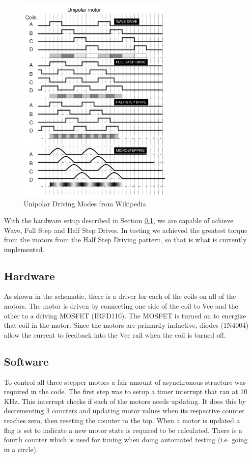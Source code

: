 \begin{figure}[H]
    \begin{center}
        \includegraphics[width=3in]{images/Drive.png}
    \end{center}
    \caption{Unipolar Driving Modes from Wikipedia}
    \label{figure:driving}
\end{figure}

With the hardware setup described in Section \ref{section:hardware}, we are capable of achieve Wave, Full Step and Half Step Drives.  In testing we achieved the greatest torque from the motors from the Half Step Driving pattern, so that is what is currently implemented.

\subsection{Hardware}
\label{section:hardware}

As shown in the schematic, there is a driver for each of the coils on all of the motors.  The motor is driven by connecting one side of the coil to Vcc and the other to a driving MOSFET (IRFD110).  The MOSFET is turned on to energize that coil in the motor.  Since the motors are primarily inductive, diodes (1N4004) allow the current to feedback into the Vcc rail when the coil is turned off.

\subsection{Software}

To control all three stepper motors a fair amount of asynchronous structure was required in the code.  The first step was to setup a timer interrupt that ran at 10 KHz.  This interrupt checks if each of the motors needs updating.  It does this by decrementing 3 counters and updating motor values when its respective counter reaches zero, then reseting the counter to the top.  When a motor is updated a flag is set to indicate a new motor state is required to be calculated.  There is a fourth counter which is used for timing when doing automated testing (i.e. going in a circle).

